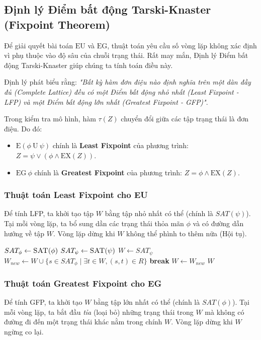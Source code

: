 \documentclass[12pt,a4paper]{article}
\begin{document}
\subsection{Định lý Điểm bất động Tarski-Knaster (Fixpoint Theorem)}
Để giải quyết bài toán $\text{EU}$ và $\text{EG}$, thuật toán yêu cầu số vòng lặp không xác định vì phụ thuộc vào độ sâu của chuỗi trạng thái. Rất may mắn, Định lý Điểm bất động Tarski-Knaster giúp chúng ta tính toán điều này.

Định lý phát biểu rằng: \textit{"Bất kỳ hàm đơn điệu nào định nghĩa trên một dàn đầy đủ (Complete Lattice) đều có một Điểm bất động nhỏ nhất (Least Fixpoint - LFP) và một Điểm bất động lớn nhất (Greatest Fixpoint - GFP)"}.

Trong kiểm tra mô hình, hàm $\tau(Z)$ chuyển đổi giữa các tập trạng thái là đơn điệu. Do đó:
\begin{itemize}
    \item $\text{E}(\phi \ \text{U} \ \psi)$ chính là \textbf{Least Fixpoint} của phương trình: $Z = \psi \lor (\phi \land \text{EX}(Z))$.
    \item $\text{EG} \ \phi$ chính là \textbf{Greatest Fixpoint} của phương trình: $Z = \phi \land \text{EX}(Z)$.
\end{itemize}

\subsubsection{Thuật toán Least Fixpoint cho EU}
Để tính LFP, ta khởi tạo tập $W$ bằng tập nhỏ nhất có thể (chính là $SAT(\psi)$). Tại mỗi vòng lặp, ta bổ sung dần các trạng thái thỏa mãn $\phi$ và có đường dẫn hướng về tập $W$. Vòng lặp dừng khi $W$ không thể phình to thêm nữa (Hội tụ).

\begin{algorithm}[H]
\caption{Tính toán $SAT(E(\phi \ U \ \psi))$ bằng LFP}\label{alg:eu}
\begin{algorithmic}[1]
\State $SAT_{\phi} \gets \Call{SAT}{\phi}$
\State $SAT_{\psi} \gets \Call{SAT}{\psi}$
\State $W \gets SAT_{\psi}$
\Loop
    \State $W_{new} \gets W \cup \{s \in SAT_{\phi} \mid \exists t \in W, (s,t) \in R \}$
        \State \textbf{break} 
    \EndIf
    \State $W \gets W_{new}$
\EndLoop
\State \Return $W$
\end{algorithmic}
\end{algorithm}

\subsubsection{Thuật toán Greatest Fixpoint cho EG}
Để tính GFP, ta khởi tạo $W$ bằng tập lớn nhất có thể (chính là $SAT(\phi)$). Tại mỗi vòng lặp, ta bắt đầu \textit{tỉa} (loại bỏ) những trạng thái trong $W$ mà không có đường đi đến một trạng thái khác nằm trong chính $W$. Vòng lặp dừng khi $W$ ngừng co lại.
\end{document}
